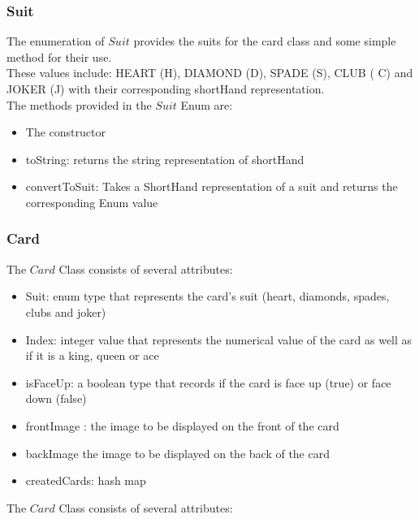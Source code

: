 \documentclass[a4paper]{project}
\begin{document}
			\subsubsection{Suit}\label{subsubsec:suit}
				
				The enumeration of $Suit$ provides the suits for the card class and some simple method for their use. \\
				These values include: HEART (H), DIAMOND (D), SPADE (S), CLUB ( C) and JOKER (J) with their corresponding shortHand representation. \\
				The methods provided in the $Suit$ Enum are:
				
				\begin{itemize}
					\item The constructor
					\item toString: returns the string representation of shortHand
					\item convertToSuit: Takes a ShortHand representation of a suit and returns the corresponding Enum value
				\end{itemize}
				
			\subsubsection{Card}\label{subsubsec:card}
				
				The $Card$ Class consists of several attributes:
				
				\begin{itemize}
					\item Suit: enum type that represents the card's suit (heart, diamonds, spades, clubs and joker)
					\item Index: integer value that represents the numerical value of the card as well as if it is a king, queen or ace
					\item isFaceUp: a boolean type that records if the card is face up (true) or face down (false)
					\item frontImage : the image to be displayed on the front of the card
					\item backImage  the image to be displayed on the back of the card
					\item createdCards: hash map
				\end{itemize}
				
				The $Card$ Class consists of several attributes:
				
\end{document}
